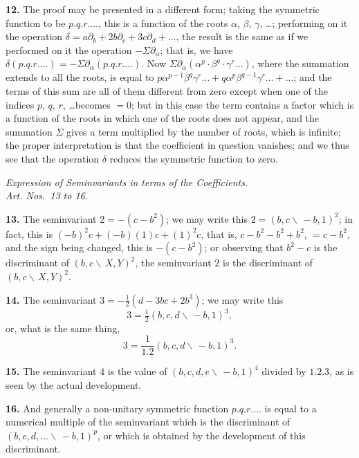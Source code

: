 \documentclass[12pt,a4paper]{article}
\theoremstyle{definition}
\begin{document}
\noindent\textbf{12.} The proof may be presented in a different form; taking the symmetric function to be $p.q.r.\dots$, this is a function of the roots $\alpha$, $\beta$, $\gamma$, \dots; performing on it the operation $\delta = a\partial_b + 2b\partial_c + 3c\partial_d + \dots$, the result is the same as if we performed on it the operation $-\Sigma\partial_\alpha$; that is, we have $\delta(p.q.r.\dots) = -\Sigma\partial_\alpha(p.q.r.\dots)$. Now $\Sigma\partial_\alpha(\alpha^p \cdot \beta^q \cdot \gamma^r \dots)$, where the summation extends to all the roots, is equal to $p\alpha^{p-1}\beta^q\gamma^r\dots + q\alpha^p\beta^{q-1}\gamma^r\dots + \dots$; and the terms of this sum are all of them different from zero except when one of the indices $p$, $q$, $r$, \dots becomes $= 0$; but in this case the term contains a factor which is a function of the roots in which one of the roots does not appear, and the summation $\Sigma$ gives a term multiplied by the number of roots, which is infinite; the proper interpretation is that the coefficient in question vanishes; and we thus see that the operation $\delta$ reduces the symmetric function to zero.

\begin{center}
\textit{Expression of Seminvariants in terms of the Coefficients.}\\
\textit{Art. Nos.~13 to 16.}
\end{center}

\noindent\textbf{13.} The seminvariant $2 = -(c - b^2)$; we may write this $2 = (b, c \!\!\!\backslash\, -b, 1)^2$; in fact, this is $(-b)^2 c + (-b)(1)c + (1)^2 c$, that is, $c - b^2 - b^2 + b^2$, $= c - b^2$, and the sign being changed, this is $-(c - b^2)$; or observing that $b^2 - c$ is the discriminant of $(b, c \!\!\!\backslash\, X, Y)^2$, the seminvariant $2$ is the discriminant of $(b, c \!\!\!\backslash\, X, Y)^2$.

\noindent\textbf{14.} The seminvariant $3 = -\tfrac{1}{2}(d - 3bc + 2b^3)$; we may write this
\[
3 = \tfrac{1}{2}(b, c, d \!\!\!\backslash\, -b, 1)^3,
\]
or, what is the same thing,
\[
3 = \frac{1}{1.2}(b, c, d \!\!\!\backslash\, -b, 1)^3.
\]

\noindent\textbf{15.} The seminvariant $4$ is the value of $(b, c, d, e \!\!\!\backslash\, -b, 1)^4$ divided by $1.2.3$, as is seen by the actual development.

\noindent\textbf{16.} And generally a non-unitary symmetric function $p.q.r.\dots$ is equal to a numerical multiple of the seminvariant which is the discriminant of $(b, c, d, \dots \!\!\!\backslash\, -b, 1)^p$, or which is obtained by the development of this discriminant.
\end{document}
